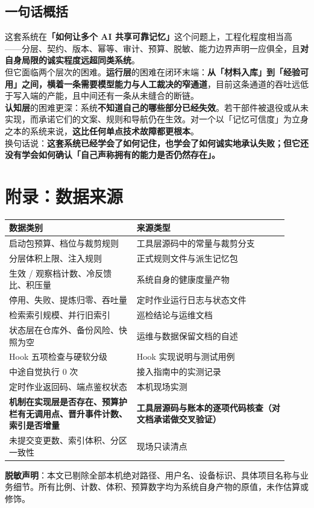 \documentclass[11pt,a4paper]{ctexart}
\newcommand{\keybox}[1]{%
  \begin{center}%
  \begin{minipage}{0.94\linewidth}%
  \setlength{\fboxsep}{9pt}%
  \colorbox{SoftGray}{\parbox{\dimexpr\linewidth-2\fboxsep}{#1}}%
  \end{minipage}%
  \end{center}%
}
\begin{document}
\subsection{一句话概括}

\keybox{\justifying
这套系统在\textbf{「如何让多个 AI 共享可靠记忆」}这个问题上，工程化程度相当高——分层、契约、版本、幂等、审计、预算、脱敏、能力边界声明一应俱全，且\textbf{对自身局限的诚实程度远超同类系统}。\\[0.5em]
但它面临两个层次的困难。\textbf{运行层}的困难在闭环末端：\textbf{从「材料入库」到「经验可用」之间，横着一条需要模型能力与人工裁决的窄通道}，目前这条通道的吞吐远低于写入端的产能，且中间还有一条从未缝合的断链。\\[0.5em]
\textbf{认知层}的困难更深：系统\textbf{不知道自己的哪些部分已经失效}。若干部件被退役或从未实现，而承诺它们的文案、规则和导航仍在生效。对一个以「记忆可信度」为立身之本的系统来说，\textbf{这比任何单点技术故障都更根本}。\\[0.5em]
换句话说：\textbf{这套系统已经学会了如何记住，也学会了如何诚实地承认失败；但它还没有学会如何确认「自己声称拥有的能力是否仍然存在」。}}

\section*{附录：数据来源}

\begin{center}
\begin{tabular}{@{}p{0.42\linewidth}p{0.50\linewidth}@{}}
\toprule
\textbf{数据类别} & \textbf{来源类型} \\
\midrule
启动包预算、档位与裁剪规则 & 工具层源码中的常量与裁剪分支 \\
分层体积上限、注入规则 & 正式规则文件与派生记忆包 \\
生效 / 观察档计数、冷反馈比、积压量 & 系统自身的健康度量产物 \\
停用、失败、提炼归零、吞吐量 & 定时作业运行日志与状态文件 \\
检索索引规模、并行旧索引 & 巡检结论与运维文档 \\
状态层在仓库外、备份风险、快照为空 & 运维与数据保留文档的自述 \\
Hook 五项检查与硬软分级 & Hook 实现说明与测试用例 \\
中途自觉执行 0 次 & 接入指南中的实测记录 \\
定时作业返回码、端点鉴权状态 & 本机现场实测 \\
\textbf{机制在实现层是否存在、预算护栏有无调用点、晋升事件计数、索引是否增量} & \textbf{工具层源码与账本的逐项代码核查（对文档承诺做交叉验证）} \\
未提交变更数、索引体积、分区一致性 & 现场只读清点 \\
\bottomrule
\end{tabular}
\end{center}

\vspace{0.8em}
\keybox{\small
\textbf{脱敏声明}：本文已剔除全部本机绝对路径、用户名、设备标识、具体项目名称与业务细节。所有比例、计数、体积、预算数字均为系统自身产物的原值，未作估算或修饰。}
\end{document}
